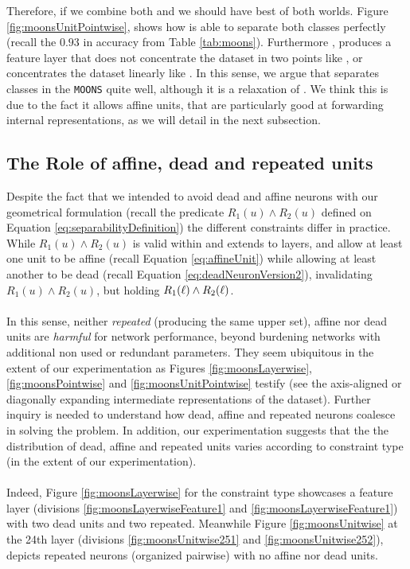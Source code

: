 Therefore, if we combine both \SepUnit and \SepPoint we should have best of both worlds. Figure \ref{fig:moonsUnitPointwise}, shows how \SepUnitPoint is able to separate both classes perfectly (recall the $0.93$ in accuracy from Table \ref{tab:moons}). Furthermore \SepUnitPoint, produces a feature layer that does not concentrate the dataset in two points like \SepUnit, or concentrates the dataset linearly like \SepPoint. In this sense, we argue that  \SepLayer separates classes in the \texttt{MOONS} quite well, although it is a relaxation of \SepUnitPoint. We think this is due to the fact it allows affine units, that are particularly good at forwarding internal representations, as we will detail in the next subsection.

\subsection{The Role of affine, dead and repeated units}\label{sec:roleofdead}

Despite the fact that we intended to avoid dead and affine neurons with our geometrical formulation (recall the predicate $R_1(u) \wedge R_2(u)$ defined on Equation \ref{eq:separabilityDefinition}) the different constraints differ in practice. While $R_1(u) \wedge R_2(u)$ is valid within \SepUnit and extends to layers, \SepLayer and \SepPoint  allow at least one unit to be affine (recall Equation \ref{eq:affineUnit}) while allowing at least another to be dead (recall Equation \ref{eq:deadNeuronVersion2}), invalidating $R_1(u) \wedge R_2(u)$, but holding $R_1(\ell) \wedge R_2(\ell)$. 
\\\\
In this sense, neither \emph{repeated} (producing the same upper set), affine nor dead units are \emph{harmful} for network performance, beyond burdening networks with additional non used or redundant parameters. They seem ubiquitous in the extent of our experimentation as Figures \ref{fig:moonsLayerwise}, \ref{fig:moonsPointwise} and \ref{fig:moonsUnitPointwise} testify (see the axis-aligned or diagonally expanding intermediate representations of the dataset). Further inquiry is needed to understand how dead, affine and repeated neurons coalesce in solving the problem. In addition, our experimentation suggests that the  the distribution of dead, affine and repeated units varies according to constraint type (in the extent of our experimentation). 
\\\\
Indeed, Figure \ref{fig:moonsLayerwise} for the \SepLayer constraint type showcases a feature layer (divisions \ref{fig:moonsLayerwiseFeature1} and \ref{fig:moonsLayerwiseFeature1}) with two dead units and two repeated. Meanwhile Figure \ref{fig:moonsUnitwise} at the 24th layer (divisions \ref{fig:moonsUnitwise251} and \ref{fig:moonsUnitwise252}), depicts repeated neurons (organized pairwise) with no affine nor dead units. 

